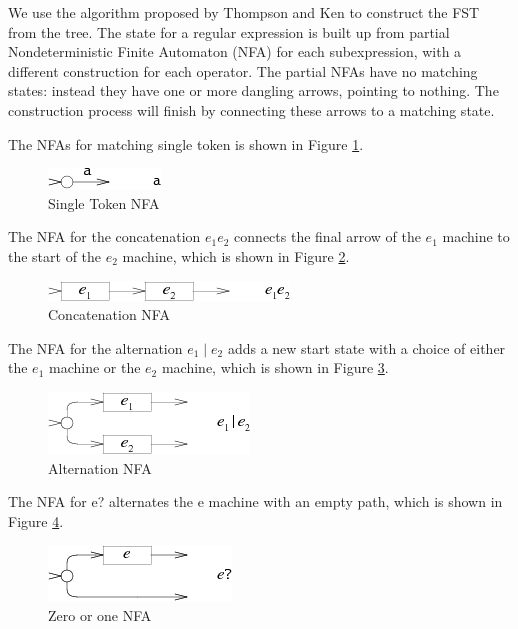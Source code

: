 We use the algorithm proposed by Thompson and Ken\cite{thompson1968programming} to construct the FST from the tree. The state for a regular expression is built up from partial Nondeterministic Finite Automaton (NFA)  for each subexpression, with a different construction for each operator. The partial NFAs have no matching states: instead they have one or more dangling arrows, pointing to nothing. The construction process will finish by connecting these arrows to a matching state.

The NFAs for matching single token is shown in Figure \ref{fig:nfa_single}.

\begin{figure}[htbp]
  \centering
  \includegraphics[scale=1]{images/single_token.png}
  \caption{Single Token NFA}
  \label{fig:nfa_single}
\end{figure}

The NFA for the concatenation $e_1e_2$ connects the final arrow of the $e_1$ machine to the start of the $e_2$ machine, which is shown in Figure \ref{fig:nfa_cocat}.

\begin{figure}[htbp]
  \centering
  \includegraphics[scale=1]{images/concatenation_tokens.png}
  \caption{Concatenation NFA}
  \label{fig:nfa_cocat}
\end{figure}

The NFA for the alternation $e_1\mid e_2$ adds a new start state with a choice of either the $e_1$ machine or the $e_2$ machine, which is shown in Figure \ref{fig:nfa_alternation}.


\begin{figure}[htbp]
  \centering
  \includegraphics[scale=1]{images/alternation.png}
  \caption{Alternation NFA}
  \label{fig:nfa_alternation}
\end{figure}

The NFA for e? alternates the e machine with an empty path, which is shown in Figure \ref{fig:nfa_question}.


\begin{figure}[htbp]
  \centering
  \includegraphics[scale=1]{images/question.png}
  \caption{Zero or one NFA}
  \label{fig:nfa_question}
\end{figure}

